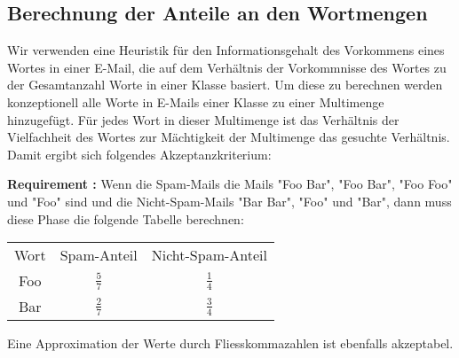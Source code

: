 \documentclass{article}
\newcounter{requirementscount}{}
\newcommand{\requirement}[1] {
        \addtocounter{requirementscount}{1}
        {\bf Requirement \therequirementscount:} #1\\
    }
\begin{document}
\subsection{Berechnung der Anteile an den Wortmengen}
Wir verwenden eine Heuristik f\"ur den Informationsgehalt des Vorkommens eines
Wortes in einer E-Mail, die auf dem Verh\"altnis der Vorkommnisse des 
Wortes zu der Gesamtanzahl Worte in einer Klasse basiert. 
Um diese zu berechnen werden konzeptionell alle Worte in E-Mails einer Klasse 
 zu einer Multimenge hinzugef\"ugt. 
F\"ur jedes Wort in dieser Multimenge ist das Verh\"altnis der
Vielfachheit des Wortes zur M\"achtigkeit der Multimenge das gesuchte
Verh\"altnis.
Damit ergibt sich folgendes Akzeptanzkriterium:\\
\requirement{Wenn die Spam-Mails die Mails "Foo Bar", "Foo Bar", "Foo Foo"
und "Foo" sind und die Nicht-Spam-Mails "Bar Bar", "Foo" und "Bar", 
dann muss diese Phase die folgende Tabelle berechnen:\\
\begin{center}
\begin{tabular}{c c c}
Wort & Spam-Anteil & Nicht-Spam-Anteil \\
Foo & \(\frac{5}{7}\) & \(\frac{1}{4}\) \\
Bar & \(\frac{2}{7}\) & \(\frac{3}{4}\)
\end{tabular}
\end{center}
Eine Approximation der Werte durch Fliesskommazahlen ist
ebenfalls akzeptabel.}
\end{document}
